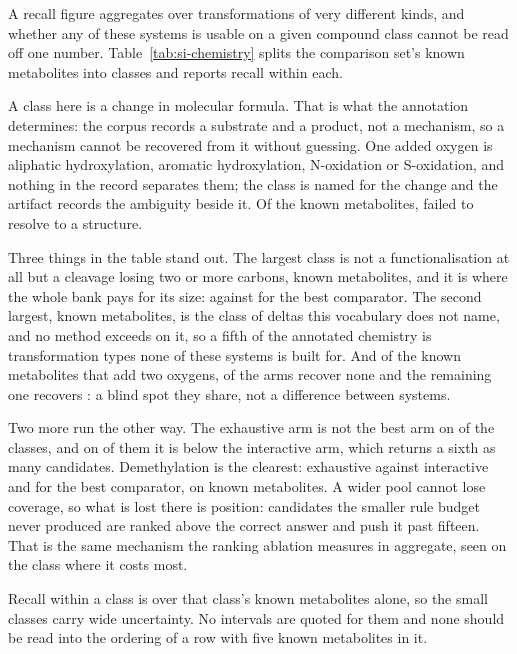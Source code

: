 \documentclass[journal=jcisd8,manuscript=suppinfo,layout=onecolumn]{achemso}
\begin{document}
A recall figure aggregates over transformations of very different kinds, and whether any of these
systems is usable on a given compound class cannot be read off one
number.
Table~\ref{tab:si-chemistry} splits the comparison set's \numChemReferences{} known metabolites into
\numChemClasses{} classes and reports recall within each.


A class here is a change in molecular formula. That is what the annotation determines: the corpus
records a substrate and a product, not a mechanism, so a mechanism cannot be recovered from it
without guessing. One added oxygen is aliphatic hydroxylation, aromatic hydroxylation,
N-oxidation or S-oxidation, and nothing in the record separates them; the class is named for the
change and the artifact records the ambiguity beside it. Of the known metabolites, \numChemUnresolvedWord{}
failed to resolve to a
structure.

Three things in the table stand out. The largest class is not a functionalisation at all
but a cleavage losing two or more carbons, \numChemCleavageRefs{} known metabolites, and it is where the
whole bank pays for its size: \numChemCleavageBank{} against \numChemCleavageBestother{} for the
best comparator. The second largest, \numChemOtherRefs{} known metabolites, is the class of deltas this
vocabulary does not name, and no method exceeds \numChemOtherBest{} on it, so a fifth of the
annotated chemistry is transformation types none of these systems is built for. And of the
\numChemDiolRefsWord{} known metabolites that add two oxygens, \numChemDiolRecovernoneWord{} of the
\numChemArmsWord{} arms recover none and the remaining one recovers \numChemDiolBest{}: a blind spot
they share, not a difference between
systems.

Two more run the other way. The exhaustive arm is not the best arm
on \numChemBehind{} of the \numChemClasses{} classes, and on
\numChemIntahead{} of them it is below the interactive arm, which returns a sixth as many
candidates. Demethylation is the clearest: \numChemDemethbank{} exhaustive against
\numChemDemethinter{} interactive and \numChemDemethbest{} for the best comparator, on
\numChemDemethrefs{} known metabolites. A wider pool cannot lose coverage, so what is lost there is
position: candidates the smaller rule budget never produced are ranked above the correct answer
and push it past fifteen. That is the same mechanism the ranking ablation measures in aggregate,
seen on the class where it costs most.

Recall within a class is over that class's known metabolites alone, so the small classes carry wide
uncertainty. No intervals are quoted for them and none should be read into the ordering of a row
with five known metabolites in it.
\end{document}
